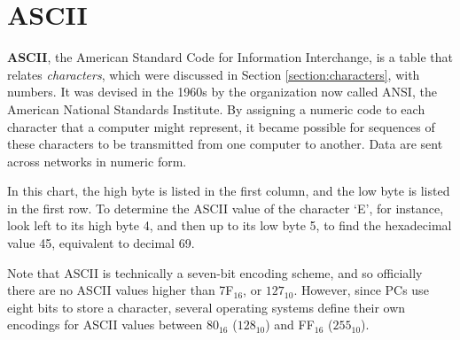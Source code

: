 
\chapter{ASCII}
\label{appendix:ascii}

\minitoc

\textbf{ASCII}, the American Standard Code for Information Interchange, is a table that relates \textit{characters}, which were discussed in Section \ref{section:characters}, with numbers.  It was devised in the 1960s by the organization now called ANSI, the American National Standards Institute.  By assigning a numeric code to each character that a computer might represent, it became possible for sequences of these characters to be transmitted from one computer to another.  Data are sent across networks in numeric form.

In this chart, the high byte is listed in the first column, and the low byte is listed in the first row.  To determine the ASCII value of the character `E', for instance, look left to its high byte 4, and then up to its low byte 5, to find the hexadecimal value 45, equivalent to decimal 69.

Note that ASCII is technically a seven-bit encoding scheme, and so officially there are no ASCII values higher than 7F$_{16}$, or $127_{10}$.  However, since PCs use eight bits to store a character, several operating systems define their own encodings for ASCII values between 80$_{16}$ ($128_{10}$) and FF$_{16}$ ($255_{10}$).

